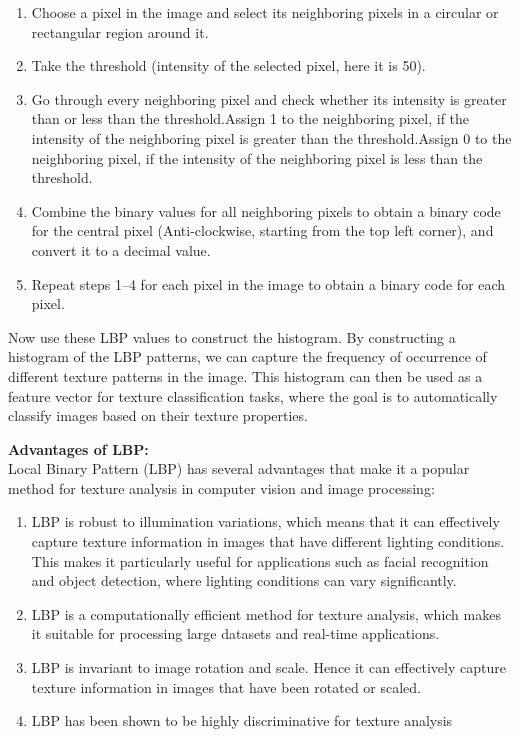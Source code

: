 \documentclass{report}
\begin{document}
{\begin{enumerate}
\begin{enumerate}
        \item Choose a pixel in the image and select its neighboring pixels in a circular or rectangular region around it.
        \item Take the threshold (intensity of the selected pixel, here it is 50).
        \item Go through every neighboring pixel and check whether its intensity is greater than or less than the threshold.Assign 1 to the neighboring pixel, if the intensity of the neighboring pixel is greater than the threshold.Assign 0 to the neighboring pixel, if the intensity of the neighboring pixel is less than the threshold.
        \item Combine the binary values for all neighboring pixels to obtain a binary code for the central pixel (Anti-clockwise, starting from the top left corner), and convert it to a decimal value.
        \item Repeat steps 1–4 for each pixel in the image to obtain a binary code for each pixel.
    \end{enumerate}

    Now use these LBP values to construct the histogram. By constructing a histogram of the LBP patterns, we can capture the frequency of occurrence of different texture patterns in the image. This histogram can then be used as a feature vector for texture classification tasks, where the goal is to automatically classify images based on their texture properties.
    
    \textbf{Advantages of LBP:}\\
    Local Binary Pattern (LBP) has several advantages that make it a popular method for texture analysis in computer vision and image processing:
    \begin{enumerate}
        \item LBP is robust to illumination variations, which means that it can effectively capture texture information in images that have different lighting conditions. This makes it particularly useful for applications such as facial recognition and object detection, where lighting conditions can vary significantly.
        \item LBP is a computationally efficient method for texture analysis, which makes it suitable for processing large datasets and real-time applications.
        \item LBP is invariant to image rotation and scale. Hence it can effectively capture texture information in images that have been rotated or scaled.
        \item LBP has been shown to be highly discriminative for texture analysis
    \end{enumerate}
    

\end{enumerate}}
\end{document}
